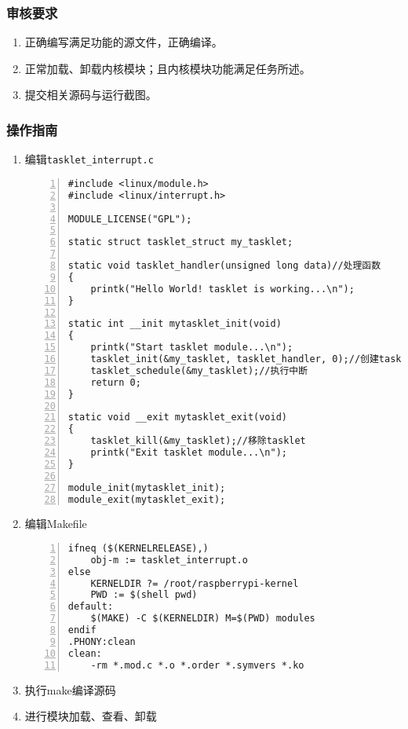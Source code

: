 \documentclass{article}
\begin{document}
\subsubsection{审核要求}
\begin{enumerate}
    \item 正确编写满足功能的源文件，正确编译。
    \item 正常加载、卸载内核模块；且内核模块功能满足任务所述。
    \item 提交相关源码与运行截图。
\end{enumerate}

\subsubsection{操作指南}
\begin{enumerate}

	\item 编辑\verb|tasklet_interrupt.c|
\begin{lstlisting}[numbers=left]
#include <linux/module.h>
#include <linux/interrupt.h>

MODULE_LICENSE("GPL");

static struct tasklet_struct my_tasklet;

static void tasklet_handler(unsigned long data)//处理函数
{
	printk("Hello World! tasklet is working...\n");
}

static int __init mytasklet_init(void)
{
	printk("Start tasklet module...\n");
	tasklet_init(&my_tasklet, tasklet_handler, 0);//创建tasklet
	tasklet_schedule(&my_tasklet);//执行中断
	return 0;
}

static void __exit mytasklet_exit(void)
{
	tasklet_kill(&my_tasklet);//移除tasklet
	printk("Exit tasklet module...\n");
}

module_init(mytasklet_init);
module_exit(mytasklet_exit);

\end{lstlisting}
    \item 编辑Makefile
\begin{lstlisting}[numbers=left]
ifneq ($(KERNELRELEASE),)
	obj-m := tasklet_interrupt.o
else
	KERNELDIR ?= /root/raspberrypi-kernel
	PWD := $(shell pwd)
default:
	$(MAKE) -C $(KERNELDIR) M=$(PWD) modules
endif
.PHONY:clean
clean:
	-rm *.mod.c *.o *.order *.symvers *.ko
\end{lstlisting}
    \item 执行make编译源码
    \item 进行模块加载、查看、卸载
\end{enumerate}
\end{document}
